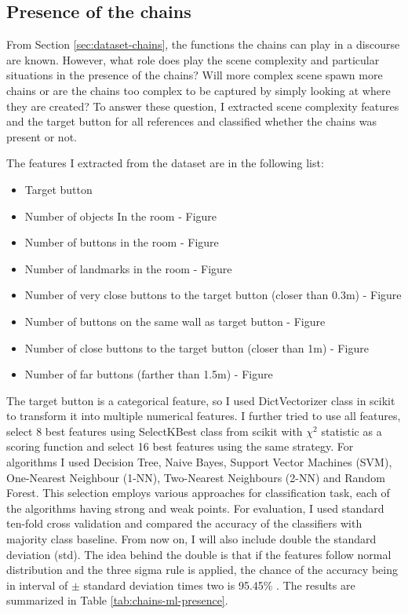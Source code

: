 \subsection{Presence of the chains}
From Section \ref{sec:dataset-chains}, the functions the chains can play in a discourse are known. However, what role does play the scene complexity and particular situations in the presence of the chains? Will more complex scene spawn more chains or are the chains too complex to be captured by simply looking at where they are created? To answer these question, I extracted scene complexity features and the target button for all references and classified whether the chains was present or not.

The features I extracted from the dataset are in the following list:

\begin{itemize}
\item
Target button	
\item
Number of objects In the room - Figure \label{fig:chains-distrib-objects}
\item
Number of buttons in the room - Figure \label{fig:chains-distrib-buttons}
\item
Number of landmarks in the room - Figure \label{fig:chains-distrib-landmarks}
\item
Number of very close buttons to the target button (closer than 0.3m) - Figure \label{fig:chains-distrib-veryclose}
\item
Number of buttons on the same wall as target button - Figure \label{fig:chains-distrib-samewall}
\item
Number of close buttons to the target button (closer than 1m) - Figure \label{fig:chains-distrib-close}
\item
Number of far buttons (farther than 1.5m) - Figure \label{fig:chains-distrib-far}
\end{itemize}

The target button is a categorical feature, so I used DictVectorizer class in scikit to transform it into multiple numerical features. I further tried to use all features, select 8 best features using SelectKBest class from scikit with $\chi^2$ statistic as a scoring function and select 16 best features using the same strategy. For algorithms I used Decision Tree, Naive Bayes, Support Vector Machines (SVM), One-Nearest Neighbour (1-NN), Two-Nearest Neighbours (2-NN) and Random Forest. This selection employs various approaches for classification task, each of the algorithms having strong and weak points. For evaluation, I used standard ten-fold cross validation and compared the accuracy of the classifiers with majority class baseline. From now on, I will also include double the standard deviation (std). The idea behind the double is that if the features follow normal distribution and the three sigma rule is applied, the chance of the accuracy being in interval of $\pm$ standard deviation times two is 95.45\% . The results are summarized in Table \ref{tab:chains-ml-presence}. 

